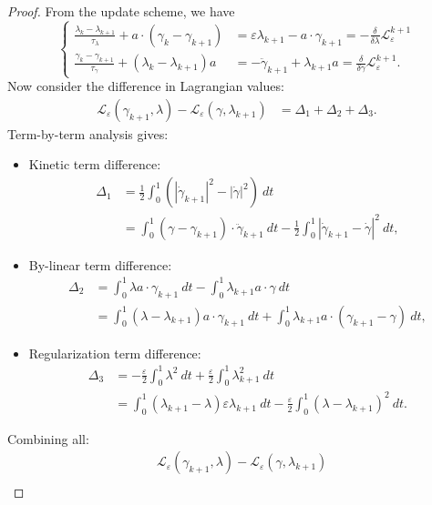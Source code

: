 \documentclass[12pt]{amsart}
\theoremstyle{definition}
\theoremstyle{remark}
\numberwithin{equation}{section}
\numberwithin{equation}{section}
\begin{document}
\begin{proof}
From the update scheme, we have 
\[\begin{cases}
    \frac{\lambda_k -\lambda_{k+1}}{\tau_{\lambda}}+ a\cdot(\gamma_k - \gamma_{k+1}) &= \varepsilon\lambda_{k+1}-a\cdot \gamma_{k+1} = -\frac{\delta}{\delta\lambda}\mathcal{L}_{\varepsilon}^{k+1}\\
    \frac{\gamma_k - \gamma_{k+1}}{\tau_{\gamma}} + (\lambda_k-\lambda_{k+1}) a & = -\ddot{\gamma}_{k+1}+\lambda_{k+1}a = \frac{\delta}{\delta\gamma}\mathcal{L}_{\varepsilon}^{k+1}.
\end{cases}\]
Now consider the difference in Lagrangian values:
\begin{align*}
    \mathcal{L}_{\varepsilon}(\gamma_{k+1},\lambda) - \mathcal{L}_{\varepsilon}(\gamma,\lambda_{k+1}) & = \Delta_1 + \Delta_2 + \Delta_3.
\end{align*}
Term-by-term analysis gives:
\begin{itemize}
    \item Kinetic term difference:
    \begin{align*}
    \Delta_1 & = \frac{1}{2}\int_0^1\left(|\dot{\gamma}_{k+1}|^2 -|\dot{\gamma}|^2\right)~dt\\
    & = \int_0^1 (\gamma-\gamma_{k+1})\cdot\ddot{\gamma}_{k+1}~dt - \frac{1}{2}\int_0^1|\dot{\gamma}_{k+1}-\dot{\gamma}|^2~dt,
\end{align*}
\item By-linear term difference: 
\begin{align*}
    \Delta_2 & = \int_0^1 \lambda a\cdot \gamma_{k+1}~dt -\int_0^1 \lambda_{k+1}a\cdot \gamma~dt\\
     & = \int_0^1 (\lambda - \lambda_{k+1})a\cdot \gamma_{k+1}~dt + \int_0^1\lambda_{k+1}a\cdot (\gamma_{k+1}-\gamma)~dt,
\end{align*}
\item Regularization term difference: 
\begin{align*}
    \Delta_3 & = -\frac{\varepsilon}{2}\int_0^1 \lambda^2~dt + \frac{\varepsilon}{2}\int_0^1 \lambda_{k+1}^2~dt\\
    & = \int_0^1(\lambda_{k+1} - \lambda)\varepsilon\lambda_{k+1}~dt - \frac{\varepsilon}{2}\int_0^1 (\lambda- \lambda_{k+1})^2~dt.
\end{align*}
\end{itemize}
Combining all:
\begin{align*}
    & \mathcal{L}_{\varepsilon}(\gamma_{k+1},\lambda) - \mathcal{L}_{\varepsilon}(\gamma,\lambda_{k+1}) \\

\end{align*}
\end{proof}
\end{document}
